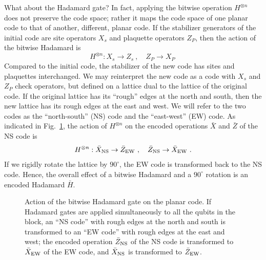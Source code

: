 What about the Hadamard gate? In fact, applying the bitwise operation $H^{\otimes n}$ does not preserve the code space; rather it maps the code space of one planar code to that of another, different, planar code. If the stabilizer generators of the initial code are site operators $X_s$ and plaquette operators $Z_P$, then the action of the bitwise Hadamard is
\begin{equation}
H^{\otimes n}: X_s \to Z_s~,\quad Z_P \to X_P~
\end{equation}
Compared to the initial code, the stabilizer of the new code has sites and plaquettes interchanged. We may reinterpret the new code as a code with $X_s$ and $Z_P$ check operators, but defined on a lattice dual to the lattice of the original code.
If the original lattice has its ``rough'' edges at the north and south, then the new lattice has its rough edges at the east and west. We will refer to the two codes as the ``north-south'' (NS) code and the ``east-west'' (EW) code. As indicated in Fig.~\ref{fig:hadamard}, the action of $H^{\otimes n}$ on the encoded operations $\bar X$ and $\bar Z$ of the NS code is
\begin{equation}
H^{\otimes n}: \bar X_{\rm NS}\to \bar Z_{\rm EW}~,\quad  \bar Z_{\rm NS}\to \bar X_{\rm EW}~.
\end{equation}
If we rigidly rotate the lattice by $90^\circ$, the EW code is transformed back to the NS code. Hence, the overall effect of a bitwise Hadamard and a $90^\circ$ rotation is an encoded Hadamard $\bar H$.

\begin{figure}
\begin{center}
\leavevmode
\epsfxsize=3in
\end{center}
\caption{Action of the bitwise Hadamard gate on the planar code. If Hadamard gates are applied simultaneously to all the qubits in the block, an ``NS code'' with rough edges at the north and south is transformed to an ``EW code'' with rough edges at the east and west; the encoded operation $\bar Z_{\rm NS}$ of the NS code is transformed to $\bar X_{\rm EW}$ of the EW code, and $\bar X_{\rm NS}$ is transformed to $\bar Z_{\rm EW}$.}
\label{fig:hadamard}
\end{figure}

